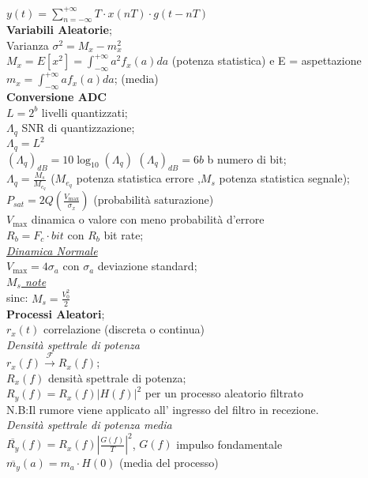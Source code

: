 \documentclass[a4paper]{article}
\begin{document}
\begin{multicols*}{2}
$y(t)=\sum_{n=-\infty}^{+\infty}{T\cdot x(nT)\cdot g(t-nT)}$ \\
\textbf{Variabili Aleatorie}; \\
Varianza $\sigma^2=M_x-m_x^2$ \\
$M_x=E[x^2]=\int_{-\infty}^{+\infty} a^2 f_x(a) da$ (potenza statistica) 
e E = aspettazione\\
$m_x=\int_{-\infty}^{+\infty} a f_x(a) da$; (media)\\
\textbf{Conversione ADC} \\
$L=2^b$ livelli quantizzati; \\
${\Lambda_q}$ SNR di quantizzazione; \\
$\Lambda_q = L^2$ \\
${({\Lambda}_q)}_{dB}=10\log_{10}{(\Lambda_q)}$
${(\Lambda_q)}_{dB} = 6b$ b numero di bit; \\
${\Lambda}_q=\frac{M_s}{M_{e_q}}$ ($M_{e_q}$ potenza statistica errore
,$M_s$ potenza statistica segnale); \\
$P_{sat}=2Q(\frac{V_{\max}}{\sigma_x})$ (probabilità saturazione) \\
$V_{\max}$ dinamica o valore con meno probabilità d'errore \\
$R_b=F_c \cdot bit$ con $R_b$ bit rate; \\
\underline{\textit{Dinamica Normale}} \\
$V_{\max} = 4\sigma_a$ con $\sigma_a$ deviazione standard;\\ 
\underline{\textit{$M_s$ note}} \\
sinc: $M_s = \frac{V_0^2}{2}$ \\
\textbf{Processi Aleatori}; \\
$r_x(t)$ correlazione (discreta o continua) \\
\textit{Densità spettrale di potenza} \\
$r_x(f) \xrightarrow{\mathscr{F}} R_x(f)$; \\ 
$R_x(f)$ densità spettrale di potenza; \\
$R_y(f) = R_x(f) |H(f)|^2$ per un processo aleatorio filtrato\\
N.B\@:Il rumore viene applicato all' ingresso del filtro in recezione. \\
\textit{Densità spettrale di potenza media} \\
$\overline{R_y}(f) = R_x(f) |\frac{G(f)}{T}|^2$, $G(f)$ impulso fondamentale\\
$\overline{m_y}(a)=m_a\cdot H(0)$ (media del processo)\\

\end{multicols*}
\end{document}
